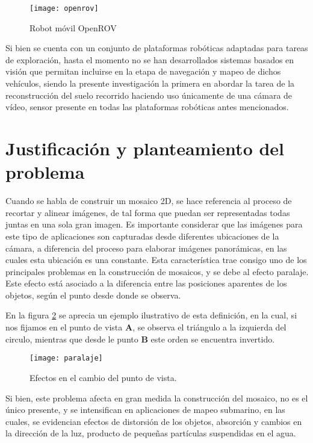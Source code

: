\begin{figure}[H]
	\centering
	\texttt{[image: openrov]}
	\caption{Robot móvil OpenROV}
	\label{imagen:openrov}
\end{figure}
Si bien se cuenta con un conjunto de plataformas robóticas adaptadas para tareas de exploración, hasta el momento no se han desarrollados sistemas basados en visión que permitan incluirse en la etapa de navegación y mapeo de dichos vehículos, siendo la presente investigación la primera en abordar la tarea de la reconstrucción del suelo recorrido haciendo uso únicamente de una cámara de vídeo, sensor presente en todas las plataformas robóticas antes mencionados.

\section{Justificación y planteamiento del problema}


Cuando se habla de construir un mosaico 2D, se hace referencia al proceso de recortar y alinear imágenes, de tal forma que puedan ser representadas todas juntas en una sola gran imagen. Es importante considerar que las imágenes para este tipo de aplicaciones son capturadas desde diferentes ubicaciones de la cámara, a diferencia del proceso para elaborar imágenes panorámicas, en las cuales esta ubicación es una constante. Esta característica trae consigo uno de los principales problemas en la construcción de mosaicos, y se debe al efecto paralaje. Este efecto está asociado a la diferencia entre las posiciones aparentes de los objetos, según el punto desde donde se observa.

En la figura \ref{imagen:paralaje} se aprecia un ejemplo ilustrativo de esta definición, en la cual, si nos fijamos en el punto de vista \textbf{A}, se observa el triángulo a la izquierda del circulo, mientras que desde le punto \textbf{B} este orden se encuentra invertido. 

\begin{figure}[H]
	\centering
	\texttt{[image: paralaje]}
	\caption[Efectos en el cambio del punto de vista]{Efectos en el cambio del punto de vista.}
	\label{imagen:paralaje}
\end{figure}

Si bien, este problema afecta en gran medida la construcción del mosaico, no es el único presente, y se intensifican en aplicaciones de mapeo submarino, en las cuales, se evidencian efectos de distorsión de los objetos, absorción y cambios en la dirección de la luz, producto de pequeñas partículas suspendidas en el agua.

